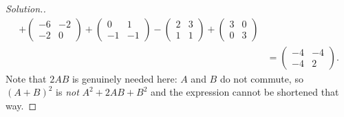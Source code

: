 \documentclass[11pt,a4paper]{article}
\theoremstyle{definition}
\newenvironment{solution}
  {\renewcommand{\qedsymbol}{}\begin{proof}[\textit{Solution}.]}
  {\end{proof}}
\begin{document}
\begin{solution}
\begin{align*}
 +\begin{pmatrix}-6&-2\\-2&0\end{pmatrix}
 +\begin{pmatrix}0&1\\-1&-1\end{pmatrix}
 -\begin{pmatrix}2&3\\1&1\end{pmatrix}
 +\begin{pmatrix}3&0\\0&3\end{pmatrix}\\
&=\begin{pmatrix}-4&-4\\-4&2\end{pmatrix}.
\end{align*}
Note that $2AB$ is genuinely needed here: $A$ and $B$ do not commute, so
$(A+B)^2$ is \emph{not} $A^2+2AB+B^2$ and the expression cannot be shortened
that way.
\end{solution}
\end{document}
